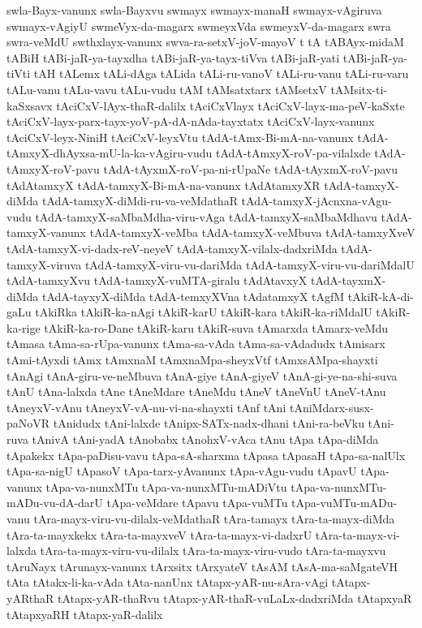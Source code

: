 {swla-Bayx-vanunx
swla-Bayxvu
swmayx
swmayx-manaH
swmayx-vAgiruva
swmayx-vAgiyU
swmeVyx-da-magarx
swmeyxVda
swmeyxV-da-magarx
swra
swra-veMdU
swthxlayx-vanunx
swva-ra-setxV-joV-mayoV
t
tA
tABAyx-midaM
tABiH
tABi-jaR-ya-tayxdha
tABi-jaR-ya-tayx-tiVva
tABi-jaR-yati
tABi-jaR-ya-tiVti
tAH
tALemx
tALi-dAga
tALida
tALi-ru-vanoV
tALi-ru-vanu
tALi-ru-varu
tALu-vanu
tALu-vavu
tALu-vudu
tAM
tAMsatxtarx
tAMsetxV
tAMsitx-ti-kaSxsavx
tAciCxV-lAyx-thaR-dalilx
tAciCxVlayx
tAciCxV-layx-ma-peV-kaSxte
tAciCxV-layx-parx-tayx-yoV-pA-dA-nAda-tayxtatx
tAciCxV-layx-vanunx
tAciCxV-leyx-NiniH
tAciCxV-leyxVtu
tAdA-tAmx-Bi-mA-na-vanunx
tAdA-tAmxyX-dhAyxsa-mU-la-ka-vAgiru-vudu
tAdA-tAmxyX-roV-pa-vilalxde
tAdA-tAmxyX-roV-pavu
tAdA-tAyxmX-roV-pa-ni-rUpaNe
tAdA-tAyxmX-roV-pavu
tAdAtamxyX
tAdA-tamxyX-Bi-mA-na-vanunx
tAdAtamxyXR
tAdA-tamxyX-diMda
tAdA-tamxyX-diMdi-ru-va-veMdathaR
tAdA-tamxyX-jAcnxna-vAgu-vudu
tAdA-tamxyX-saMbaMdha-viru-vAga
tAdA-tamxyX-saMbaMdhavu
tAdA-tamxyX-vanunx
tAdA-tamxyX-veMba
tAdA-tamxyX-veMbuva
tAdA-tamxyXveV
tAdA-tamxyX-vi-dadx-reV-neyeV
tAdA-tamxyX-vilalx-dadxriMda
tAdA-tamxyX-viruva
tAdA-tamxyX-viru-vu-dariMda
tAdA-tamxyX-viru-vu-dariMdalU
tAdA-tamxyXvu
tAdA-tamxyX-vuMTA-giralu
tAdAtavxyX
tAdA-tayxmX-diMda
tAdA-tayxyX-diMda
tAdA-temxyXVna
tAdatamxyX
tAgfM
tAkiR-kA-di-gaLu
tAkiRka
tAkiR-ka-nAgi
tAkiR-karU
tAkiR-kara
tAkiR-ka-riMdalU
tAkiR-ka-rige
tAkiR-ka-ro-Dane
tAkiR-karu
tAkiR-suva
tAmarxda
tAmarx-veMdu
tAmasa
tAma-sa-rUpa-vanunx
tAma-sa-vAda
tAma-sa-vAdadudx
tAmisarx
tAmi-tAyxdi
tAmx
tAmxnaM
tAmxnaMpa-sheyxVtf
tAmxsAMpa-shayxti
tAnAgi
tAnA-giru-ve-neMbuva
tAnA-giye
tAnA-giyeV
tAnA-gi-ye-na-shi-suva
tAnU
tAna-lalxda
tAne
tAneMdare
tAneMdu
tAneV
tAneVnU
tAneV-tAnu
tAneyxV-vAnu
tAneyxV-vA-nu-vi-na-shayxti
tAnf
tAni
tAniMdarx-susx-paNoVR
tAnidudx
tAni-lalxde
tAnipx-SATx-nadx-dhani
tAni-ra-beVku
tAni-ruva
tAnivA
tAni-yadA
tAnobabx
tAnohxV-vAca
tAnu
tApa
tApa-diMda
tApakekx
tApa-paDisu-vavu
tApa-sA-sharxma
tApasa
tApasaH
tApa-sa-nalUlx
tApa-sa-nigU
tApasoV
tApa-tarx-yAvanunx
tApa-vAgu-vudu
tApavU
tApa-vanunx
tApa-va-nunxMTu
tApa-va-nunxMTu-mADiVtu
tApa-va-nunxMTu-mADu-vu-dA-darU
tApa-veMdare
tApavu
tApa-vuMTu
tApa-vuMTu-mADu-vanu
tAra-mayx-viru-vu-dilalx-veMdathaR
tAra-tamayx
tAra-ta-mayx-diMda
tAra-ta-mayxkekx
tAra-ta-mayxveV
tAra-ta-mayx-vi-dadxrU
tAra-ta-mayx-vi-lalxda
tAra-ta-mayx-viru-vu-dilalx
tAra-ta-mayx-viru-vudo
tAra-ta-mayxvu
tAruNayx
tArunayx-vanunx
tArxsitx
tArxyateV
tAsAM
tAsA-ma-saMgateVH
tAta
tAtakx-li-ka-vAda
tAta-nanUnx
tAtapx-yAR-nu-sAra-vAgi
tAtapx-yARthaR
tAtapx-yAR-thaRvu
tAtapx-yAR-thaR-vuLaLx-dadxriMda
tAtapxyaR
tAtapxyaRH
tAtapx-yaR-dalilx
}
